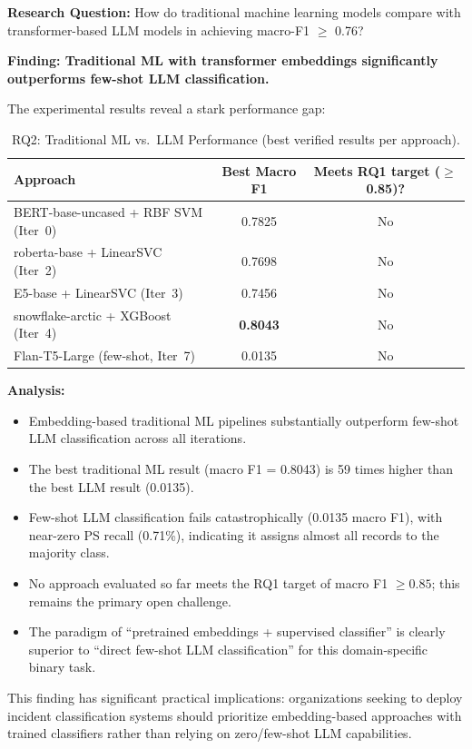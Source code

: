 \documentclass[11pt, titlepage, bibliography=totoc]{scrreprt}
\begin{document}
\textbf{Research Question:} How do traditional machine learning models compare with transformer-based LLM models in achieving macro-F1 $\geq$ 0.76?

\textbf{Finding: Traditional ML with transformer embeddings significantly outperforms few-shot LLM classification.}

The experimental results reveal a stark performance gap:

\begin{table}[htbp]
\centering
\caption{RQ2: Traditional ML vs.\ LLM Performance (best verified results per approach).}
\begin{tabular}{@{}lcc@{}}
\toprule
\textbf{Approach} & \textbf{Best Macro F1} & \textbf{Meets RQ1 target ($\geq$0.85)?} \\
\midrule
BERT-base-uncased + RBF SVM (Iter~0)           & 0.7825 & No \\
roberta-base + LinearSVC (Iter~2)              & 0.7698 & No \\
E5-base + LinearSVC (Iter~3)                   & 0.7456 & No \\
snowflake-arctic + XGBoost (Iter~4)            & \textbf{0.8043} & No \\
Flan-T5-Large (few-shot, Iter~7)               & 0.0135 & No \\
\bottomrule
\end{tabular}
\end{table}

\textbf{Analysis:}
\begin{itemize}
    \item Embedding-based traditional ML pipelines substantially outperform few-shot LLM classification across all iterations.
    \item The best traditional ML result (macro F1 = 0.8043) is 59 times higher than the best LLM result (0.0135).
    \item Few-shot LLM classification fails catastrophically (0.0135 macro F1), with near-zero PS recall (0.71\%), indicating it assigns almost all records to the majority class.
    \item No approach evaluated so far meets the RQ1 target of macro F1 $\geq 0.85$; this remains the primary open challenge.
    \item The paradigm of ``pretrained embeddings + supervised classifier'' is clearly superior to ``direct few-shot LLM classification'' for this domain-specific binary task.
\end{itemize}

This finding has significant practical implications: organizations seeking to deploy incident classification systems should prioritize embedding-based approaches with trained classifiers rather than relying on zero/few-shot LLM capabilities.
\end{document}

